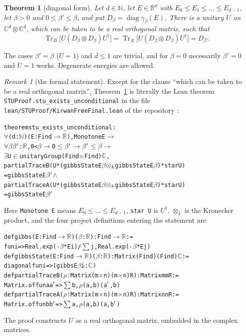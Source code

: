 \documentclass[11pt]{amsart}
\newtheorem{mainthm}{Theorem}
\theoremstyle{definition}
\theoremstyle{remark}
\newtheorem{remark}[lemma]{Remark}
\numberwithin{equation}{section}
\newcommand{\R}{\mathbb{R}}
\newcommand{\C}{\mathbb{C}}
\newcommand{\N}{\mathbb{N}}
\newcommand{\Tr}{\operatorname{Tr}}
\newcommand{\diag}{\operatorname{diag}}
\newcommand{\lean}[1]{\texttt{#1}}
\begin{document}
\begin{mainthm}[diagonal form]\label{thm:diag}
Let $d\in\N$, let $E\in\R^d$ with $E_0\le E_1\le\dots\le E_{d-1}$, let $\beta>0$ and
$0\le\beta'\le\beta$, and put $D_\beta=\diag\gamma_\beta(E)$. There is a unitary $U$ on
$\C^d\otimes\C^d$, which can be taken to be a real orthogonal matrix, such that
\[
  \Tr_B\bigl[U(D_\beta\otimes D_\beta)U^\dagger\bigr]=\Tr_A\bigl[U(D_\beta\otimes D_\beta)U^\dagger\bigr]
  =D_{\beta'} .
\]
\end{mainthm}

The cases $\beta'=\beta$ ($U=1$) and $d\le1$ are trivial, and for $\beta=0$ necessarily $\beta'=0$ and
$U=1$ works. Degenerate energies are allowed.

\begin{remark}[the formal statement]\label{rem:leanstatement}
Except for the clause ``which can be taken to be a real orthogonal matrix'', Theorem~\ref{thm:diag}
is literally the Lean theorem \lean{STUProof.stu\_exists\_unconditional} in the file
\lean{lean/STUProof/KirwanFreeFinal.lean} of the repository \cite{STUrepo}:
\begin{alltt}\small
theorem stu_exists_unconditional :
    \(\forall\) (d : \(\mathbb{N}\)) (E : Fin d \(\to\) \(\mathbb{R}\)), Monotone E \(\to\)
    \(\forall\) \(\beta\) \(\beta\sp{\prime}\) : \(\mathbb{R}\), 0 < \(\beta\) \(\to\) 0 \(\le\) \(\beta\sp{\prime}\) \(\to\) \(\beta\sp{\prime}\) \(\le\) \(\beta\) \(\to\)
      \(\exists\) U \(\in\) unitaryGroup (Fin d \(\times\) Fin d) \(\mathbb{C}\),
        partialTraceB (U * (gibbsState E \(\beta\) \(\otimes\sb{k}\) gibbsState E \(\beta\)) * star U)
            = gibbsState E \(\beta\sp{\prime}\) \(\wedge\)
        partialTraceA (U * (gibbsState E \(\beta\) \(\otimes\sb{k}\) gibbsState E \(\beta\)) * star U)
            = gibbsState E \(\beta\sp{\prime}\)
\end{alltt}
Here \lean{Monotone E} means $E_0\le\dots\le E_{d-1}$, \lean{star U} is $U^\dagger$,
$\otimes_k$ is the Kronecker product, and the four project definitions entering the statement are
\begin{alltt}\small
def gibbs (E : Fin d \(\to\) \(\mathbb{R}\)) (\(\beta\) : \(\mathbb{R}\)) : Fin d \(\to\) \(\mathbb{R}\) :=
  fun i => Real.exp (-\(\beta\) * E i) / \(\sum\) j, Real.exp (-\(\beta\) * E j)
def gibbsState (E : Fin d \(\to\) \(\mathbb{R}\)) (\(\beta\) : \(\mathbb{R}\)) : Matrix (Fin d) (Fin d) \(\mathbb{C}\) :=
  diagonal fun i => (gibbs E \(\beta\) i : \(\mathbb{C}\))
def partialTraceB (\(\rho\) : Matrix (m \(\times\) n) (m \(\times\) n) R) : Matrix m m R :=
  Matrix.of fun a a\(\sp{\prime}\) => \(\sum\) b, \(\rho\) (a, b) (a\(\sp{\prime}\), b)
def partialTraceA (\(\rho\) : Matrix (m \(\times\) n) (m \(\times\) n) R) : Matrix n n R :=
  Matrix.of fun b b\(\sp{\prime}\) => \(\sum\) a, \(\rho\) (a, b) (a, b\(\sp{\prime}\))
\end{alltt}
The proof constructs $U$ as a real orthogonal matrix, embedded in the complex matrices.
\end{remark}
\end{document}
